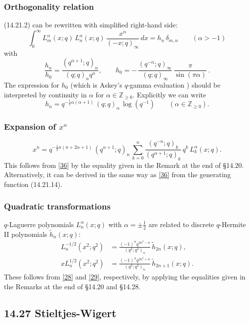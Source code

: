 \documentclass[twoside,11pt]{article}
\newcommand\ZZ{\mathbb{Z}}
\newcommand\al\alpha
\newcommand\de\delta
\newcommand\half{\frac12}
\newcommand\iy\infty
\newcommand\wt{\widetilde}
\newcommand\Znonneg{\ZZ_{\ge0}}
\newcommand\RHS{right-hand side}
\begin{document}
\subsubsection*{Orthogonality relation}
(14.21.2) can be rewritten with simplified \RHS:
\begin{equation}
\int_0^\iy L_m^{\al}(x;q)\,L_n^{\al}(x;q)\,\frac{x^\al}{(-x;q)_\iy}\,dx=h_n\,\de_{m,n}
\qquad(\al>-1)
\label{119}
\end{equation}
with
\begin{equation}
\frac{h_n}{h_0}=\frac{(q^{\al+1};q)_n}{(q;q)_n q^n},\qquad
h_0=-\,\frac{(q^{-\al};q)_\iy}{(q;q)_\iy}\,\frac\pi{\sin(\pi\al)}\,.
\label{120}
\end{equation}
The expression for $h_0$ (which is Askey's $q$-gamma evaluation
\cite[(4.2)]{K16})
should be interpreted by continuity in $\al$ for
$\al\in\Znonneg$.
Explicitly we can write
\begin{equation}
h_n=q^{-\half\al(\al+1)}\,(q;q)_\al\,\log(q^{-1})\qquad(\al\in\Znonneg).
\label{121}
\end{equation}
%
\subsubsection*{Expansion of $x^n$}
\begin{equation}
x^n=q^{-\half n(n+2\al+1)}\,(q^{\al+1};q)_n\,
\sum_{k=0}^n\frac{(q^{-n};q)_k}{(q^{\al+1};q)_k}\,q^k\,L_k^\al(x;q).
\label{37}
\end{equation}
This follows from \eqref{36} by the equality given in the Remark at the end
of \S14.20. Alternatively, it can be derived in the same way as \eqref{36}
from the generating function (14.21.14).
%
\subsubsection*{Quadratic transformations}
$q$-Laguerre polynomials $L_n^\al(x;q)$ with $\al=\pm\half$ are
related to discrete $q$-Hermite II polynomials $\wt h_n(x;q)$:
\begin{align}
L_n^{-1/2}(x^2;q^2)&=
\frac{(-1)^n q^{2n^2-n}}{(q^2;q^2)_n}\,\wt h_{2n}(x;q),
\label{38}\\
xL_n^{1/2}(x^2;q^2)&=
\frac{(-1)^n q^{2n^2+n}}{(q^2;q^2)_n}\,\wt h_{2n+1}(x;q).
\label{39}
\end{align}
These follows from \eqref{28} and \eqref{29}, respectively, by applying
the equalities given in the Remarks at the end of \S14.20 and \S14.28.
%
\subsection*{14.27 Stieltjes-Wigert}
\label{sec14.27}
%
\end{document}
